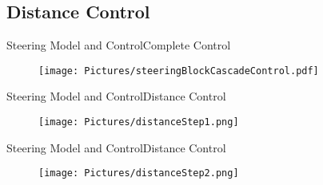 
\subsection{Distance Control}

\begin{frame}{Steering Model and Control}{Complete Control}
  \begin{figure}[H]
    \centering
    \texttt{[image: Pictures/steeringBlockCascadeControl.pdf]}
  \end{figure}
\end{frame}

\begin{frame}{Steering Model and Control}{Distance Control}
  \begin{figure}[H]
    \centering
    \texttt{[image: Pictures/distanceStep1.png]}
  \end{figure}
\end{frame}


\begin{frame}{Steering Model and Control}{Distance Control}
  \begin{figure}[H]
    \centering
    \texttt{[image: Pictures/distanceStep2.png]}
  \end{figure}
\end{frame}


